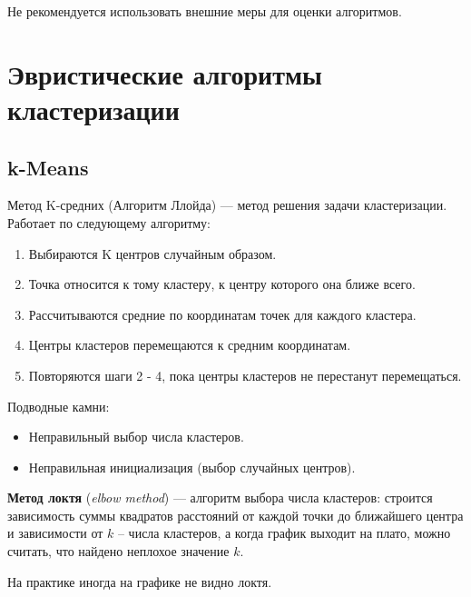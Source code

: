 \begin{remark}
    Не рекомендуется использовать внешние меры для оценки алгоритмов.
\end{remark}

\section{Эвристические алгоритмы кластеризации}

\subsection{k-Means}

\begin{definition}
    Метод K-средних (Алгоритм Ллойда) --- метод решения задачи кластеризации. Работает по следующему алгоритму:
    \begin{enumerate}
        \item Выбираются K центров случайным образом.
        \item Точка относится к тому кластеру, к центру которого она ближе всего.
        \item Рассчитываются средние по координатам точек для каждого кластера.
        \item Центры кластеров перемещаются к средним координатам.
        \item Повторяются шаги 2 - 4, пока центры кластеров не перестанут перемещаться.
    \end{enumerate}
\end{definition}

Подводные камни:
\begin{itemize}
    \item Неправильный выбор числа кластеров.
    \item Неправильная инициализация (выбор случайных центров).
\end{itemize}

\begin{definition}
    \textbf{Метод локтя} (\textit{elbow method}) --- алгоритм выбора числа кластеров: строится зависимость суммы квадратов расстояний от каждой точки до ближайшего центра и зависимости от $k$ -- числа кластеров, а когда график выходит на плато, можно считать, что найдено неплохое значение $k$.
\end{definition}

\begin{remark}
    На практике иногда на графике не видно локтя.
\end{remark}

